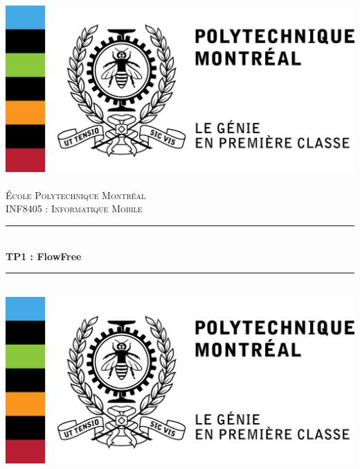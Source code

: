 \documentclass[12pt, a4paper]{article}
\newcommand{\HRule}{\rule{\linewidth}{0.5mm}}
\begin{document}
\begin{titlepage}
  \begin{sffamily}
  \begin{center}

    \includegraphics[scale=1]{Images/polytechnique_genie_gauche_fr_rgb.png}~\\[1.5cm]

    \textsc{\LARGE École Polytechnique Montréal}\\[2cm]

    \textsc{\Large INF8405 : Informatique Mobile}\\[1.5cm]

    \HRule \\[0.4cm]
    { \huge \bfseries TP1 : FlowFree\\[0.4cm] }

    \HRule \\[2cm]
    \includegraphics[scale=0.5]{Images/polytechnique_genie_gauche_fr_rgb.png}
    \\[2cm]


\end{center}
\end{sffamily}
\end{titlepage}
\end{document}

